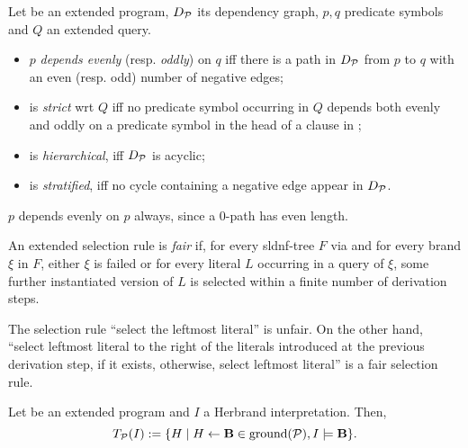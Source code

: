 \begin{dfn}
    Let \prog be an extended program, \(D_\mathcal{P}\) its dependency graph, \(p,q\) predicate symbols and \(Q\) an extended query.
    \begin{itemize}
        \item \(p\) \emph{depends evenly} (resp. \emph{oddly}) on \(q\) iff there is a path in \(D_\mathcal{P}\) from \(p\) to \(q\) with an even (resp. odd) number of negative edges;
        \item \prog is \emph{strict} wrt \(Q\) iff no predicate symbol occurring in \(Q\) depends both evenly and oddly on a predicate symbol in the head of a clause in \prog;
        \item \prog is \emph{hierarchical}, iff \(D_\mathcal{P}\) is acyclic;
        \item \prog is \emph{stratified}, iff no cycle containing a negative edge appear in \(D_\mathcal{P}\).
    \end{itemize}
\end{dfn}

\begin{rem}
    \(p\) depends evenly on \(p\) always, since a \(0\)-path has even length.
\end{rem}

\begin{dfn}[fairness]
    An extended selection rule  is \emph{fair} if, for every \gls{sldnf}-tree \(F\) via  and for every brand \(\xi\) in \(F\), either \(\xi\) is failed or for every literal \(L\) occurring in a query of \(\xi\), some further instantiated version of \(L\) is selected within a finite number of derivation steps.
\end{dfn}

\begin{exa}
    The selection rule ``select the leftmost literal'' is unfair.
    On the other hand, ``select leftmost literal to the right of the literals introduced at the previous derivation step, if it exists, otherwise, select leftmost literal'' is a fair selection rule.
\end{exa}

\begin{dfn}
    Let \prog be an extended program and \(I\) a Herbrand interpretation.
    Then,
    \begin{equation*}
        T_\mathcal{P}(I) := \lbrace H \mid H \leftarrow \mathbf{B} \in \operatorname{ground}(\mathcal{P}), I \models \mathbf{B} \rbrace.
    \end{equation*}
\end{dfn}


